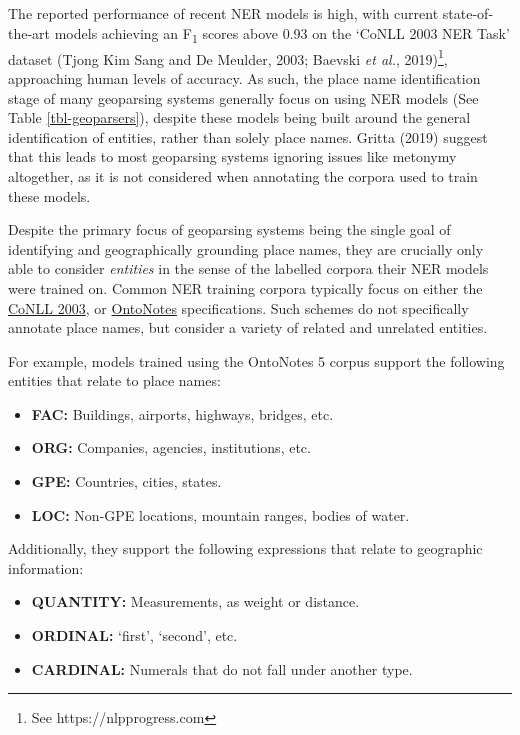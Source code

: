 \documentclass[
  letterpaper,
  11pt,
  english,
  onehalfspacing,
  headsepline]{MastersDoctoralThesis}
\providecommand{\tightlist}{%
  \setlength{\itemsep}{0pt}\setlength{\parskip}{0pt}}\usepackage{longtable,booktabs,array}
\begin{document}
The reported performance of recent NER models is high, with current
state-of-the-art models achieving an F\textsubscript{1} scores above
0.93 on the `CoNLL 2003 NER Task' dataset (Tjong Kim Sang and De
Meulder, 2003; Baevski \emph{et al.}, 2019)\footnote{See
  https://nlpprogress.com}, approaching human levels of accuracy. As
such, the place name identification stage of many geoparsing systems
generally focus on using NER models (See Table \ref{tbl-geoparsers}),
despite these models being built around the general identification of
entities, rather than solely place names. Gritta (2019) suggest that
this leads to most geoparsing systems ignoring issues like metonymy
altogether, as it is not considered when annotating the corpora used to
train these models.

Despite the primary focus of geoparsing systems being the single goal of
identifying and geographically grounding place names, they are crucially
only able to consider \emph{entities} in the sense of the labelled
corpora their NER models were trained on. Common NER training corpora
typically focus on either the
\href{https://www.clips.uantwerpen.be/conll2003/ner}{CoNLL 2003}, or
\href{https://catalog.ldc.upenn.edu/LDC2013T19}{OntoNotes}
specifications. Such schemes do not specifically annotate place names,
but consider a variety of related and unrelated entities.

For example, models trained using the OntoNotes 5 corpus support the
following entities that relate to place names:

\begin{itemize}
\tightlist
\item
  \textbf{FAC:} Buildings, airports, highways, bridges, etc.
\item
  \textbf{ORG:} Companies, agencies, institutions, etc.
\item
  \textbf{GPE:} Countries, cities, states.
\item
  \textbf{LOC:} Non-GPE locations, mountain ranges, bodies of water.
\end{itemize}

Additionally, they support the following expressions that relate to
geographic information:

\begin{itemize}
\tightlist
\item
  \textbf{QUANTITY:} Measurements, as weight or distance.
\item
  \textbf{ORDINAL:} `first', `second', etc.
\item
  \textbf{CARDINAL:} Numerals that do not fall under another type.
\end{itemize}
\end{document}
